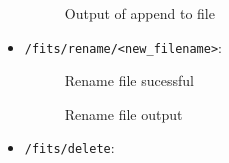 \documentclass[a4paper,oneside,11pt]{book}
\begin{document}
\begin{itemize}
\begin{figure}[h]
        \caption{Output of append to file}
    \end{figure}
    \clearpage
    \item \texttt{/fits/rename/<new\_filename>}: 
    \begin{figure}[h]
        \centering
        \caption{Rename file sucessful}
    \end{figure}
    \begin{figure}[h]
        \centering
        \caption{Rename file output}
    \end{figure}
    \clearpage
    \item \texttt{/fits/delete}: 
    \begin{figure}[h]
        \centering

\end{figure}
\end{itemize}
\end{document}

